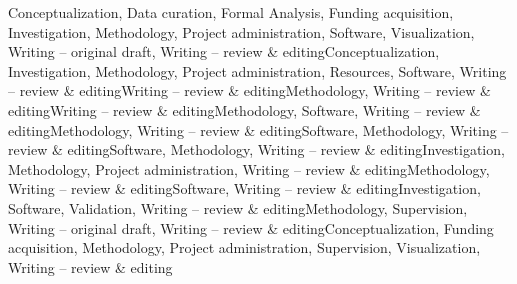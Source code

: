 \markdownRendererDlDefinitionBegin Conceptualization, Data curation, Formal Analysis, Funding acquisition, Investigation, Methodology, Project administration, Software, Visualization, Writing – original draft, Writing – review \& editing\markdownRendererDlDefinitionEnd \markdownRendererDlItemEnd {}\markdownRendererDlDefinitionBegin Conceptualization, Investigation, Methodology, Project administration, Resources, Software, Writing – review \& editing\markdownRendererDlDefinitionEnd \markdownRendererDlItemEnd {}\markdownRendererDlDefinitionBegin Writing – review \& editing\markdownRendererDlDefinitionEnd \markdownRendererDlItemEnd {}\markdownRendererDlDefinitionBegin Methodology, Writing – review \& editing\markdownRendererDlDefinitionEnd \markdownRendererDlItemEnd {}\markdownRendererDlDefinitionBegin Writing – review \& editing\markdownRendererDlDefinitionEnd \markdownRendererDlItemEnd {}\markdownRendererDlDefinitionBegin Methodology, Software, Writing – review \& editing\markdownRendererDlDefinitionEnd \markdownRendererDlItemEnd {}\markdownRendererDlDefinitionBegin Methodology, Writing – review \& editing\markdownRendererDlDefinitionEnd \markdownRendererDlItemEnd {}\markdownRendererDlDefinitionBegin Software, Methodology, Writing – review \& editing\markdownRendererDlDefinitionEnd \markdownRendererDlItemEnd {}\markdownRendererDlDefinitionBegin Software, Methodology, Writing – review \& editing\markdownRendererDlDefinitionEnd \markdownRendererDlItemEnd {}\markdownRendererDlDefinitionBegin Investigation, Methodology, Project administration, Writing – review \& editing\markdownRendererDlDefinitionEnd \markdownRendererDlItemEnd {}\markdownRendererDlDefinitionBegin Methodology, Writing – review \& editing\markdownRendererDlDefinitionEnd \markdownRendererDlItemEnd {}\markdownRendererDlDefinitionBegin Software, Writing – review \& editing\markdownRendererDlDefinitionEnd \markdownRendererDlItemEnd {}\markdownRendererDlDefinitionBegin Investigation, Software, Validation, Writing – review \& editing\markdownRendererDlDefinitionEnd \markdownRendererDlItemEnd {}\markdownRendererDlDefinitionBegin Methodology, Supervision, Writing – original draft, Writing – review \& editing\markdownRendererDlDefinitionEnd \markdownRendererDlItemEnd {}\markdownRendererDlDefinitionBegin Conceptualization, Funding acquisition, Methodology, Project administration, Supervision, Visualization, Writing – review \& editing\markdownRendererDlDefinitionEnd \markdownRendererDlItemEnd 

